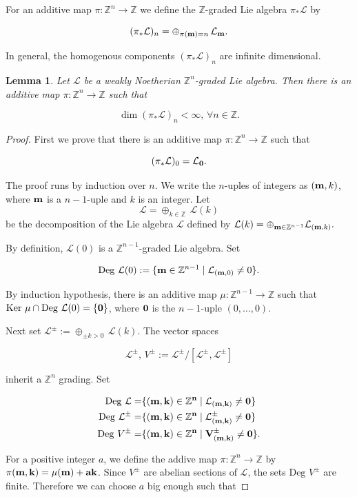 \documentclass[11pt, letterpaper, reqno]{amsart}
\newtheorem{lemma}[theorem]{Lemma}
\theoremstyle{definition}
\newcommand{\Z}{{\mathbb Z}}
\newcommand{\cL}{\mathcal L}
\newcommand{\Deg}{\mathrm{Deg\,}}
\newcommand{\Ker}{\operatorname{Ker}}
\begin{document}
For an additive map $\pi:\Z^n\to\Z$ we define the $\Z$-graded Lie algebra
$\pi_*\cL$ by

$$(\pi_*\cL)_n=\oplus_{\pi({\bf m})=n}
\,\cL_{\bf m}.$$

\noindent In general, the homogenous components
$(\pi_*\cL)_n$ are infinite dimensional.

\begin{lemma}\label{reduc} Let $\cL$ be a weakly 
Noetherian $\Z^n$-graded Lie algebra. Then
there is an additive map 
$\pi:\Z^n\to\Z$ such that

$$\dim (\pi_*\cL)_n<\infty, \,\forall n\in\Z.$$
\end{lemma}

\begin{proof}
First we prove that there is an 
additive map $\pi:\Z^n\to\Z$ such that

$$(\pi_*\cL)_0=\cL_{\bf 0}.$$

The proof runs by induction over $n$.
We write the $n$-uples
of integers as $({\bf m},k)$, where
${\bf m}$ is a $n-1$-uple and $k$ is an integer.
Let 
$$\cL=\oplus_{k\in\Z}\,\cL(k)$$
be the decomposition of the Lie algebra $\cL$
defined by 
$\cL(k)=\oplus_{{\bf m}\in \Z^{n-1}} 
\cL_{({\bf m},k)}.$

By definition, $\cL(0)$
is a $\Z^{n-1}$-graded Lie algebra. Set

$$\Deg\,\cL(0):=
\{{\bf m}\in  \Z^{n-1}\mid 
\cL_{({\bf m},0)}\neq 0\}.$$

By induction
hypothesis, there is an additive map
$\mu:  \Z^{n-1}\to\Z$ such that
$\Ker\,\mu\cap \Deg\,\cL(0)=\{{\bf 0}\}$, where
${\bf 0}$ is the $n-1$-uple $(0,\ldots,0)$.

Next set 
$\cL^\pm:=\oplus_{\pm k>0}\, \cL(k)$. 
The vector spaces 

$$\cL^\pm,\,V^\pm:=\cL^\pm/[\cL^\pm,\cL^\pm]$$

\noindent inherit a $\Z^n$ grading. Set

\begin{align*}
\Deg\,\cL=&\{(\bf m,k)\in \Z^n
\mid \cL_{(\bf m,k)}\neq 0\}\\
\Deg\,\cL^\pm=&\{(\bf m,k)\in \Z^n
\mid \cL^\pm_{(\bf m,k)}\neq 0\}\\
\Deg\,V^\pm=&\{(\bf m,k)\in \Z^n
\mid V^\pm_{(\bf m,k)}\neq 0\}.
\end{align*}



For a positive integer $a$, we define the addive map $\pi:\Z^n\to\Z$ by 
$\pi(\bf m,k)=\mu({\bf m})+ak$. 
Since $V^\pm$ are abelian sections of $\cL$,  the sets
$\Deg\,V^\pm$ are finite. Therefore we can
 choose $a$ big enough such that


\end{proof}
\end{document}
